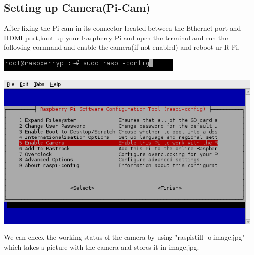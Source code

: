 \documentclass[a4paper,12pt,oneside]{book}
\begin{document}
		\subsection{Setting up Camera(Pi-Cam)}
		After fixing the Pi-cam in its connector located between the Ethernet port and HDMI port,boot up your Raspberry-Pi and open the terminal and run the following command and enable the camera(if not enabled) and reboot ur R-Pi.
		\begin{center}
			\includegraphics[scale=0.6]{cmd.png}
		\end{center}
		\begin{center}
		   \includegraphics[scale=0.6]{enablecam.png}
		\end{center}
		\par We can check the working status of the camera by using "raspistill -o image.jpg" which takes a picture with the camera and stores it in image.jpg. 
	
\end{document}
